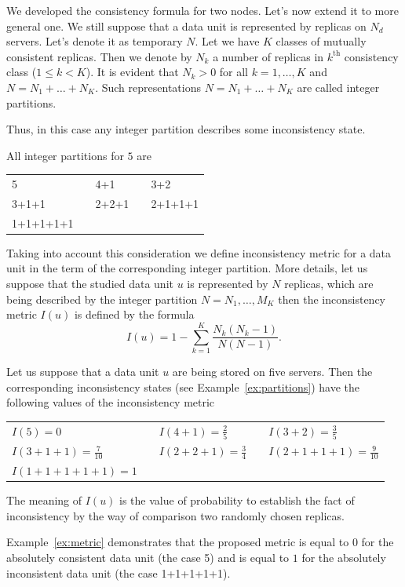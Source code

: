 \documentclass{llncs}
\begin{document}
We developed the consistency formula for two nodes. Let's now extend it to more general one.
We still suppose that a data unit is represented by replicas on $N_d$ servers. Let's denote it as temporary $N$.
Let we have $K$ classes of mutually consistent replicas.
Then we denote by $N_k$ a number of replicas in $k^\mathrm{th}$ consistency class ($1\leq k<K$).
It is evident that $N_k>0$ for all $k=1,\ldots,K$ and $N=N_1+\ldots+N_K$.
Such representations $N=N_1+\ldots+N_K$ are called integer partitions.

\noindent Thus, in this case any integer partition describes some inconsistency state.

\begin{example}\label{ex:partitions}
All integer partitions for $5$ are
\begin{center}
\begin{tabular}{lclcl}
	5 & & 4+1 & & 3+2\\
	3+1+1 &\hspace*{10pt}& 2+2+1 &\hspace*{10pt}& 2+1+1+1\\
	1+1+1+1+1
\end{tabular}
\end{center}
\end{example}

Taking into account this consideration we define inconsistency metric for a data unit in the term of the corresponding integer partition.
More details, let us suppose that the studied data unit $u$ is represented by $N$ replicas, which are being described by the integer partition $N=N_1,\ldots,M_K$ then the inconsistency metric $I(u)$ is defined by the formula
\begin{equation}\label{eq:metric}
	I(u)=1-\sum_{k=1}^K\dfrac{N_k(N_k-1)}{N(N-1)}.
\end{equation}

\begin{example}\label{ex:metric}
Let us suppose that a data unit $u$ are being stored on five servers.
Then the corresponding inconsistency states (see Example~\ref{ex:partitions}) have the following values of the inconsistency metric
\begin{center}
\begin{tabular}{lclcl}
	$I(5)=0$ & & $I(4+1)=\frac{2}{5}$ & & $I(3+2)=\frac{3}{5}$\\
	$I(3+1+1)=\frac{7}{10}$ &\hspace*{10pt}& $I(2+2+1)=\frac{3}{4}$
		&\hspace*{10pt}& $I(2+1+1+1)=\frac{9}{10}$\\
	$I(1+1+1+1+1)=1$
\end{tabular}
\end{center}
The meaning of $I(u)$ is the value of probability to establish the fact of inconsistency by the way of comparison two randomly chosen replicas.
\end{example}
Example~\ref{ex:metric} demonstrates that the proposed metric is equal to $0$ for the absolutely consistent data unit (the case 5) and is equal to $1$ for the absolutely inconsistent data unit (the case 1+1+1+1+1).
\end{document}
